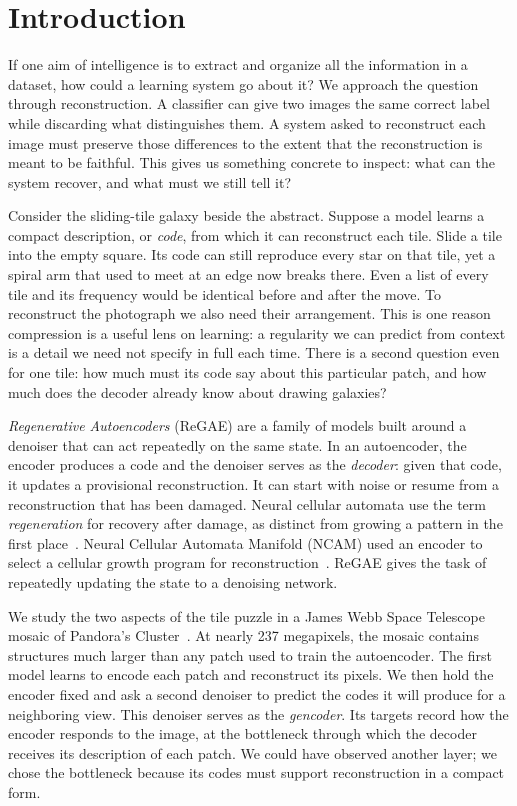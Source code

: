 \section{Introduction}
\label{sec:introduction}

If one aim of intelligence is to extract and organize all the information in a dataset, how could a learning system go about it? We approach the question through reconstruction. A classifier can give two images the same correct label while discarding what distinguishes them. A system asked to reconstruct each image must preserve those differences to the extent that the reconstruction is meant to be faithful. This gives us something concrete to inspect: what can the system recover, and what must we still tell it?

Consider the sliding-tile galaxy beside the abstract. Suppose a model learns a compact description, or \emph{code}, from which it can reconstruct each tile. Slide a tile into the empty square. Its code can still reproduce every star on that tile, yet a spiral arm that used to meet at an edge now breaks there. Even a list of every tile and its frequency would be identical before and after the move. To reconstruct the photograph we also need their arrangement. This is one reason compression is a useful lens on learning: a regularity we can predict from context is a detail we need not specify in full each time. There is a second question even for one tile: how much must its code say about this particular patch, and how much does the decoder already know about drawing galaxies?

\emph{Regenerative Autoencoders} (ReGAE) are a family of models built around a denoiser that can act repeatedly on the same state. In an autoencoder, the encoder produces a code and the denoiser serves as the \emph{decoder}: given that code, it updates a provisional reconstruction. It can start with noise or resume from a reconstruction that has been damaged. Neural cellular automata use the term \emph{regeneration} for recovery after damage, as distinct from growing a pattern in the first place~\cite{nca}. Neural Cellular Automata Manifold (NCAM) used an encoder to select a cellular growth program for reconstruction~\cite{ncam}. ReGAE gives the task of repeatedly updating the state to a denoising network.

We study the two aspects of the tile puzzle in a James Webb Space Telescope mosaic of Pandora's Cluster~\cite{webb}. At nearly 237 megapixels, the mosaic contains structures much larger than any patch used to train the autoencoder. The first model learns to encode each patch and reconstruct its pixels. We then hold the encoder fixed and ask a second denoiser to predict the codes it will produce for a neighboring view. This denoiser serves as the \emph{gencoder}. Its targets record how the encoder responds to the image, at the bottleneck through which the decoder receives its description of each patch. We could have observed another layer; we chose the bottleneck because its codes must support reconstruction in a compact form.

